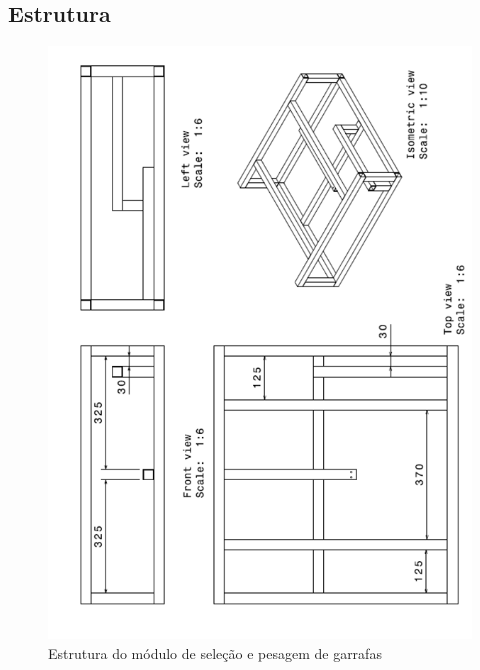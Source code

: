 \begin{anexosenv}

\partanexos

\chapter{Estrutura}

\begin{figure}[!ht]
	\centering
		\includegraphics[scale=0.6]{figuras/estrutura/anexos/1(1).png}
	\caption{Estrutura do módulo de seleção e pesagem de garrafas}
\end{figure}


\end{anexosenv}
